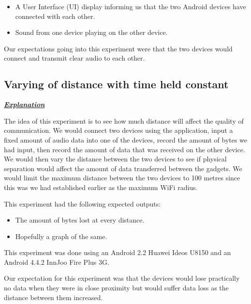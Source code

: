 \documentclass[12pt,svgnames,smaller]{article} %
\begin{document}
\begin{itemize}
	\item A User Interface (UI) display informing us that the two Android devices have connected with each other.
	\item Sound from one device playing on the other device.
\end{itemize}

Our expectations going into this experiment were that the two devices would connect and transmit clear audio to each other.



\subsection{Varying of distance with time held constant}

\textbf{\textit{\underline{Explanation}}}

The idea of this experiment is to see how much distance will affect the quality of communication. We would connect two devices using the application, input a fixed amount of audio data into one of the devices, record the amount of bytes we had input, then record the amount of data that was received on the other device. We would then vary the distance between the two devices to see if physical separation would affect the amount of data transferred between the gadgets. We would limit the maximum distance between the two devices to 100 metres since this was we had established earlier as the maximum WiFi radius. 

This experiment had the following expected outputs:

\begin{itemize}
	\item The amount of bytes lost at every distance.
	\item Hopefully a graph of the same.
\end{itemize}

This experiment was done using an Android 2.2 Huawei Ideos U8150 and an Android 4.4.2 InnJoo Fire Plus 3G.

Our expectation for this experiment was that the devices would lose practically no data when they were in close proximity but would suffer data loss as the distance between them increased.
\end{document}
